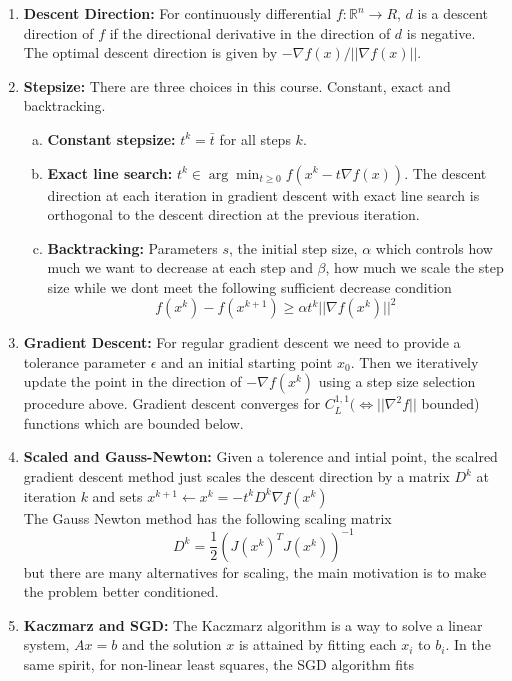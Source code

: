 \documentclass{article}
\begin{document}
\begin{enumerate}
    \item \textbf{Descent Direction:} For continuously differential \(f: \mathbb{R}^n \to R\), \(d\) is a descent direction of \(f\) if the directional derivative in the direction of \(d\) is negative. The optimal descent direction is given by \(-\nabla f(x)/||\nabla f(x)||\).
    \item \textbf{Stepsize:} There are three choices in this course. Constant, exact and backtracking.
    \begin{enumerate} [a.]
        \item \textbf{Constant stepsize:} \(t^k = \bar t\) for all steps \(k\).
        \item \textbf{Exact line search:} \(t^k \in \arg\min_{t\geq0} f(x^k-t \nabla f(x))\). The descent direction at each iteration in gradient descent with exact line search is orthogonal to the descent direction at the previous iteration.
        \item \textbf{Backtracking:} Parameters \(s\), the initial step size, \(\alpha\) which controls how much we want to decrease at each step and \(\beta\), how much we scale the step size while we dont meet the following sufficient decrease condition
        \[
        f(x^k)-f(x^{k+1}) \geq \alpha t^k||\nabla f(x^k)||^2
        \]
    \end{enumerate}
    \item \textbf{Gradient Descent:} For regular gradient descent we need to provide a tolerance parameter \(\epsilon\) and an initial starting point \(x_0\). Then we iteratively update the point in the direction of \(-\nabla f(x^k)\) using a step size selection procedure above. Gradient descent converges for \(C^{1,1}_L (\iff ||\nabla^2 f||\) bounded) functions which are bounded below. 
    \item \textbf{Scaled and Gauss-Newton:} Given a tolerence and intial point, the scalred gradient descent method just scales the descent direction by a matrix \(D^k\) at iteration \(k\) and sets \(x^{k+1} \leftarrow x^k = - t^kD^k \nabla f(x^k)\)\\

    The Gauss Newton method has the following scaling matrix
    \[
    D^k = \frac{1}{2}\left(J(x^k)^T J(x^k)\right)^{-1}
    \]
    but there are many alternatives for scaling, the main motivation is to make the problem better conditioned.

    \item \textbf{Kaczmarz and SGD:} The Kaczmarz algorithm is a way to solve a linear system, \(Ax = b\) and the solution \(x\) is attained by fitting each \(x_i\) to \(b_i\). In the same spirit, for non-linear least squares, the SGD algorithm fits
\end{enumerate}
\end{document}
